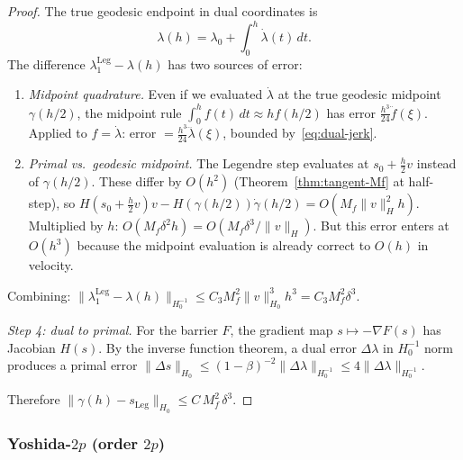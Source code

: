 \documentclass[11pt]{article}
\begin{document}
\begin{proof}
The true geodesic endpoint in dual coordinates is
\[
  \lambda(h) = \lambda_0 + \int_0^h \dot\lambda(t)\,dt.
\]
The difference $\lambda_1^{\text{Leg}} - \lambda(h)$ has two
sources of error:
\begin{enumerate}
  \item \emph{Midpoint quadrature.}  Even if we evaluated
    $\dot\lambda$ at the true geodesic midpoint $\gamma(h/2)$,
    the midpoint rule
    $\int_0^h f(t)\,dt \approx hf(h/2)$ has error
    $\frac{h^3}{24}\ddot f(\xi)$.  Applied to $f = \dot\lambda$:
    error $= \frac{h^3}{24}\dddot\lambda(\xi)$, bounded
    by~\eqref{eq:dual-jerk}.
  \item \emph{Primal vs.\ geodesic midpoint.}  The Legendre step
    evaluates at $s_0 + \frac{h}{2}v$ instead of $\gamma(h/2)$.
    These differ by $O(h^2)$ (Theorem~\ref{thm:tangent-Mf} at
    half-step), so $H(s_0 + \frac{h}{2}v)v - H(\gamma(h/2))\dot\gamma(h/2)
    = O(M_f\|v\|_H^2 h)$.  Multiplied by $h$: $O(M_f\delta^2 h)
    = O(M_f\delta^3/\|v\|_H)$.  But this error enters at $O(h^3)$
    because the midpoint evaluation is already correct to $O(h)$
    in velocity.
\end{enumerate}
Combining: $\|\lambda_1^{\text{Leg}} - \lambda(h)\|_{H_0^{-1}}
\leq C_3 M_f^2 \|v\|_{H_0}^3 h^3 = C_3 M_f^2 \delta^3$.

\medskip\noindent\textit{Step 4: dual to primal.}\quad
For the barrier $F$, the gradient map $s \mapsto -\nabla F(s)$ has
Jacobian $H(s)$.  By the inverse function theorem, a dual error
$\Delta\lambda$ in $H_0^{-1}$ norm produces a primal error
$\|\Delta s\|_{H_0} \leq (1-\beta)^{-2}\|\Delta\lambda\|_{H_0^{-1}}
\leq 4\|\Delta\lambda\|_{H_0^{-1}}$.

Therefore $\|\gamma(h) - s_{\text{Leg}}\|_{H_0}
\leq C\, M_f^2\, \delta^3$.
\end{proof}

\subsubsection{Yoshida-$2p$ (order $2p$)}
\end{document}
